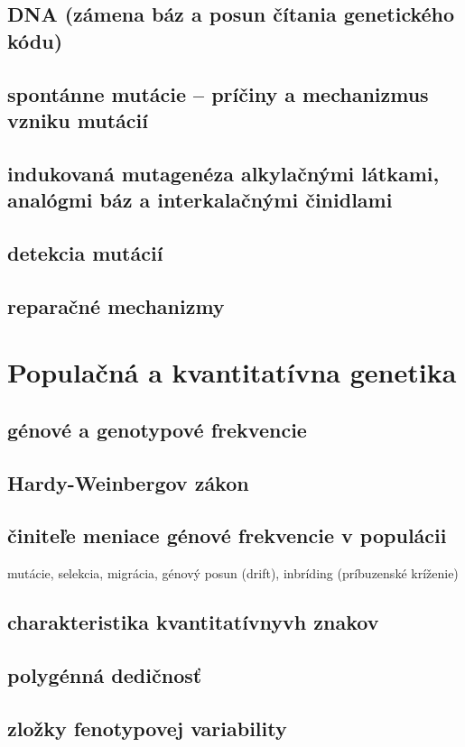 \subsection*{DNA (zámena báz a posun čítania genetického kódu)}
\subsection*{spontánne mutácie -- príčiny a mechanizmus vzniku mutácií}
\subsection*{indukovaná mutagenéza alkylačnými látkami, analógmi báz a interkalačnými činidlami}
\subsection*{detekcia mutácií}
\subsection*{reparačné mechanizmy}

\section{Populačná a kvantitatívna genetika}
\subsection*{génové a genotypové frekvencie}
\subsection*{Hardy-Weinbergov zákon}
\subsection*{činiteľe meniace génové frekvencie v populácii}
mutácie, selekcia, migrácia, génový posun (drift), inbríding (príbuzenské kríženie)\\
\subsection*{charakteristika kvantitatívnyvh znakov}
\subsection*{polygénná dedičnosť}
\subsection*{zložky fenotypovej variability}
